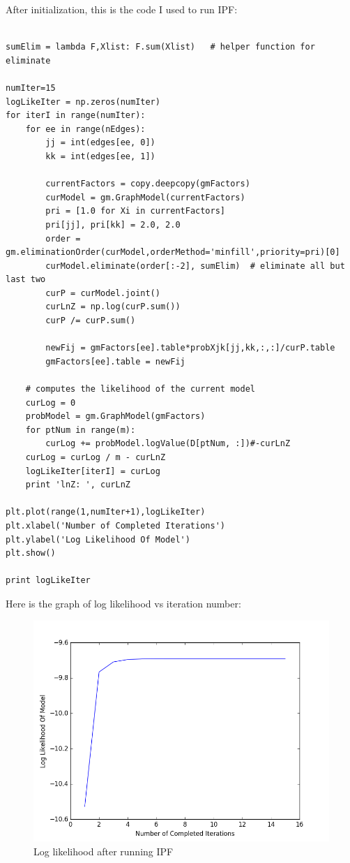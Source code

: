 \documentclass[twoside,11pt]{article}
\theoremstyle{definition}
\begin{document}
After initialization, this is the code I used to run IPF:

\begin{lstlisting}

sumElim = lambda F,Xlist: F.sum(Xlist)   # helper function for eliminate

numIter=15
logLikeIter = np.zeros(numIter)
for iterI in range(numIter):
    for ee in range(nEdges):
        jj = int(edges[ee, 0])
        kk = int(edges[ee, 1])

        currentFactors = copy.deepcopy(gmFactors)
        curModel = gm.GraphModel(currentFactors)
        pri = [1.0 for Xi in currentFactors]
        pri[jj], pri[kk] = 2.0, 2.0
        order = gm.eliminationOrder(curModel,orderMethod='minfill',priority=pri)[0]
        curModel.eliminate(order[:-2], sumElim)  # eliminate all but last two
        curP = curModel.joint()
        curLnZ = np.log(curP.sum())
        curP /= curP.sum()

        newFij = gmFactors[ee].table*probXjk[jj,kk,:,:]/curP.table
        gmFactors[ee].table = newFij

    # computes the likelihood of the current model
    curLog = 0
    probModel = gm.GraphModel(gmFactors)
    for ptNum in range(m):
        curLog += probModel.logValue(D[ptNum, :])#-curLnZ
    curLog = curLog / m - curLnZ
    logLikeIter[iterI] = curLog
    print 'lnZ: ', curLnZ

plt.plot(range(1,numIter+1),logLikeIter)
plt.xlabel('Number of Completed Iterations')
plt.ylabel('Log Likelihood Of Model')
plt.show()

print logLikeIter
\end{lstlisting}
\newpage

Here is the graph of log likelihood vs iteration number:

\begin{figure}[h]
\centering
\includegraphics[width=6in]{prob2cPlot2.png}
\caption{Log likelihood after running IPF}
\end{figure}
\end{document}
